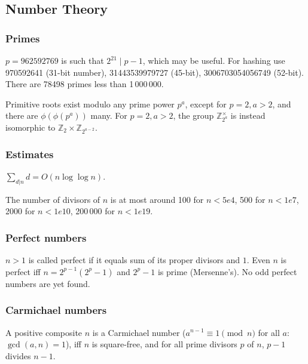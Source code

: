 \subsection{Number Theory}

\subsubsection{Primes}
$p=962592769$ is such that $2^{21} \mid p-1$, which may be useful. For hashing
use 970592641 (31-bit number), 31443539979727 (45-bit), 3006703054056749
(52-bit). There are 78498 primes less than 1\,000\,000.

Primitive roots exist modulo any prime power $p^a$, except for $p = 2, a > 2$, and there are $\phi(\phi(p^a))$ many.
For $p = 2, a > 2$, the group $\mathbb Z_{2^a}^\times$ is instead isomorphic to $\mathbb Z_2 \times \mathbb Z_{2^{a-2}}$.

\subsubsection{Estimates}
$\sum_{d|n} d = O(n \log \log n)$.

The number of divisors of $n$ is at most around 100 for $n < 5e4$, 500 for $n < 1e7$, 2000 for $n < 1e10$, 200\,000 for $n < 1e19$.

\subsubsection{Perfect numbers}
$n>1$ is called perfect if it equals
sum of its proper divisors and $1$.  Even $n$ is perfect iff $n = 2^{p-1} (2^p - 1)$
and $2^p - 1$ is prime (Mersenne's). No odd perfect numbers are yet found.

\subsubsection{Carmichael numbers}
A positive composite $n$ is a Carmichael number
($a^{n-1} \equiv 1 \pmod{n}$ for all $a$: $\gcd(a,n)=1$),
iff $n$ is square-free, and for all prime divisors $p$ of $n$, $p-1$ divides $n-1$.

